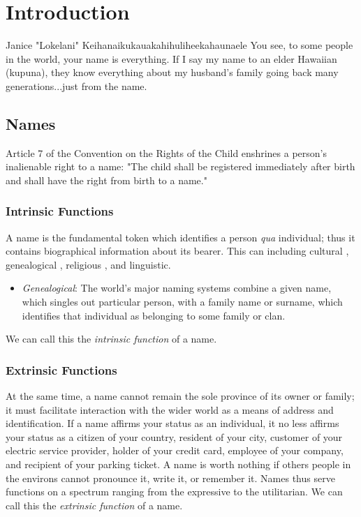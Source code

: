 \section{Introduction}

\begin{aquote}{Janice "Lokelani" Keihanaikukauakahihuliheekahaunaele}
You see, to some people in the world, your name is everything. If I say my name
to an elder Hawaiian (kupuna), they know everything about my husband's family
going back many generations...just from the name.
\end{aquote}

\subsection{Names}

Article 7 of the Convention on the Rights of the Child enshrines a person's
inalienable right to a name: "The child shall be registered immediately after
birth and shall have the right from birth to a name." \parencite{crc}

\subsubsection{Intrinsic Functions}

A name is the fundamental token which identifies a person \textit{qua}
individual; thus it contains biographical information about its bearer. This
can including cultural , genealogical , religious , and linguistic. 

\begin{itemize}
\item \textit{Genealogical}: The world's major naming systems combine a
given name, which singles out particular person, with a family name or surname,
which identifies that individual as belonging to some family or clan.
\end{itemize}

We can call
this the \textit{intrinsic function} of a name.

\subsubsection{Extrinsic Functions}

At the same time, a name cannot remain the sole province of its owner or family;
it must facilitate interaction with the wider world as a means of address and
identification. If a name affirms your status as an individual, it no less
affirms your status as a citizen of your country, resident of your city,
customer of your electric service provider, holder of your credit card, employee
of your company, and recipient of your parking ticket. A name is worth nothing
if others people in the environs cannot pronounce it, write it, or remember it.
Names thus serve functions on a spectrum ranging from the expressive to the
utilitarian. We can call this the \textit{extrinsic function} of a name.

